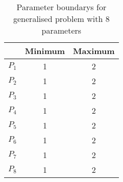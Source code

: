 \begin{table}
\centering
\caption{Parameter boundarys for generalised problem with 8 parameters}
\label{tab:gen_parameter_space}
\begin{tabular}{lcc}
\toprule
{} & Minimum & Maximum \\
\midrule
\textbf{$P_1$} &       1 &       2 \\
\textbf{$P_2$} &       1 &       2 \\
\textbf{$P_3$} &       1 &       2 \\
\textbf{$P_4$} &       1 &       2 \\
\textbf{$P_5$} &       1 &       2 \\
\textbf{$P_6$} &       1 &       2 \\
\textbf{$P_7$} &       1 &       2 \\
\textbf{$P_8$} &       1 &       2 \\
\bottomrule
\end{tabular}
\end{table}

